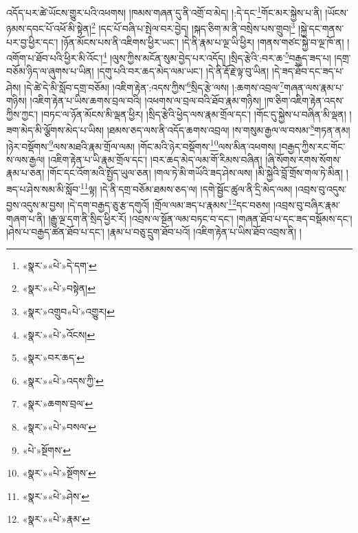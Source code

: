 འདོད་པར་ཚེ་ཡོངས་གྱུར་པའི་འཕགས། །ཁམས་གཞན་དུ་ནི་འགྲོ་བ་མེད། །:དེ་དང་\footnote{«སྣར་»«པེ་»དེ་དག་}གོང་མར་སྐྱེས་པ་ནི། །ཡོངས་ཉམས་དབང་པོ་འཕོ་མི་སྟེན།\footnote{«སྣར་»«པེ་»བསྟེན།} །དང་པོ་བཞི་པ་སྤེལ་བར་བྱེད། །སྐད་ཅིག་མ་ནི་བསྲེས་པས་གྲུབ།\footnote{«སྣར་»འགྲུབ«པེ་»འགྱུར།} །སྐྱེ་དང་གནས་པར་བྱ་ཕྱིར་དང་། །ཉོན་མོངས་པས་ནི་འཇིགས་ཕྱིར་ཡང་། །དེ་ནི་རྣམ་པ་ལྔ་ཡི་ཕྱིར། །གནས་གཙང་སྐྱེ་བ་ལྔ་ཁོ་ན། །འགོག་པ་ཐོབ་པའི་ཕྱིར་མི་འོང་།\footnote{«སྣར་»«པེ་»འོངས།} །ལུས་ཀྱིས་མངོན་སུམ་བྱེད་པར་འདོད། །སྲིད་རྩེའི་:བར་ཆ་\footnote{«སྣར་»བར་ཆད་}བརྒྱད་ཟད་པ། །དགྲ་བཅོམ་ཉིད་ལ་ཞུགས་པ་ཡིན། །དགུ་པའི་བར་ཆད་མེད་ལམ་ཡང་། །དེ་ནི་རྡོ་རྗེ་ལྟ་བུ་ཡིན། །དེ་ཟད་ཐོབ་དང་ཟད་པ་ཤེས། །དེ་ཚེ་དེ་མི་སློབ་དགྲ་བཅོམ། །འཇིག་རྟེན་:འདས་ཀྱིས་\footnote{«སྣར་»«པེ་»འདས་ཀྱི་}སྲིད་རྩེ་ལས། །:ཆགས་འབྲལ་\footnote{«སྣར་»ཆགས་བྲལ་}གཞན་ལས་རྣམ་པ་གཉིས། །འཇིག་རྟེན་པ་ཡིས་ཆགས་བྲལ་བའི། །འཕགས་ལ་བྲལ་བའི་ཐོབ་རྣམ་གཉིས། །ཁ་ཅིག་འཇིག་རྟེན་འདས་ཀྱིས་ཀྱང་། །བཏང་ལ་ཉོན་མོངས་མི་ལྡན་ཕྱིར། །སྲིད་རྩེའི་ཕྱེད་ལས་རྣམ་གྲོལ་དང་། །གོང་དུ་སྐྱེས་པ་བཞིན་མི་ལྡན། །ཟག་མེད་མི་ལྕོགས་མེད་པ་ཡིས། །ཐམས་ཅད་ལས་ནི་འདོད་ཆགས་འབྲལ། །ས་གསུམ་རྒྱལ་ལ་བསམ་\footnote{«སྣར་»«པེ་»བསལ་}གཏན་ནམ། །ཉེར་བསྡོགས་\footnote{«པེ་»སྔོགས་}ལས་མཐའི་རྣམ་གྲོལ་ལམ། །གོང་མའི་ཉེར་བསྡོགས་\footnote{«སྣར་»«པེ་»སྔོགས་}ལས་མིན་འཕགས། །བརྒྱད་ཀྱིས་རང་གོང་ས་ལས་རྒྱལ། །འཇིག་རྟེན་པ་ཡི་རྣམ་གྲོལ་དང་། །བར་ཆད་མེད་ལམ་གོ་རིམས་བཞིན། །ཞི་སོགས་རགས་སོགས་རྣམ་པ་ཅན། །གོང་དང་འོག་མའི་སྤྱོད་ཡུལ་ཅན། །གལ་ཏེ་མི་གཡོའི་ཟད་ཤེས་ལས། །མི་སྐྱེའི་བློ་གྲོས་གལ་ཏེ་མིན། །ཟད་པ་ཤེས་སམ་མི་སློབ་\footnote{«སྣར་»«པེ་»ཤེས་}ལྟ། །དེ་ནི་དགྲ་བཅོམ་ཐམས་ཅད་ལ། །དགེ་སྦྱོང་ཚུལ་ནི་དྲི་མེད་ལམ། །འབྲས་བུ་འདུས་བྱས་འདུས་མ་བྱས། །དེ་དག་བརྒྱད་ཅུ་རྩ་དགུའོ། །གྲོལ་ལམ་ཟད་པ་རྣམས་\footnote{«སྣར་»«པེ་»རྣམ་}དང་བཅས། །འབྲས་བུ་བཞིར་རྣམ་གཞག་པ་ནི། །རྒྱུ་ལྔ་དག་ནི་སྲིད་ཕྱིར་རོ། །འབྲས་ལ་སྔོན་ལམ་བཏང་བ་དང་། །གཞན་ཐོབ་པ་དང་ཟད་བསྡོམས་དང་། །ཤེས་པ་བརྒྱད་ཚན་ཐོབ་པ་དང་། །རྣམ་པ་བཅུ་དྲུག་ཐོབ་པའོ། །འཇིག་རྟེན་པ་ཡིས་ཐོབ་འབྲས་ནི། །
